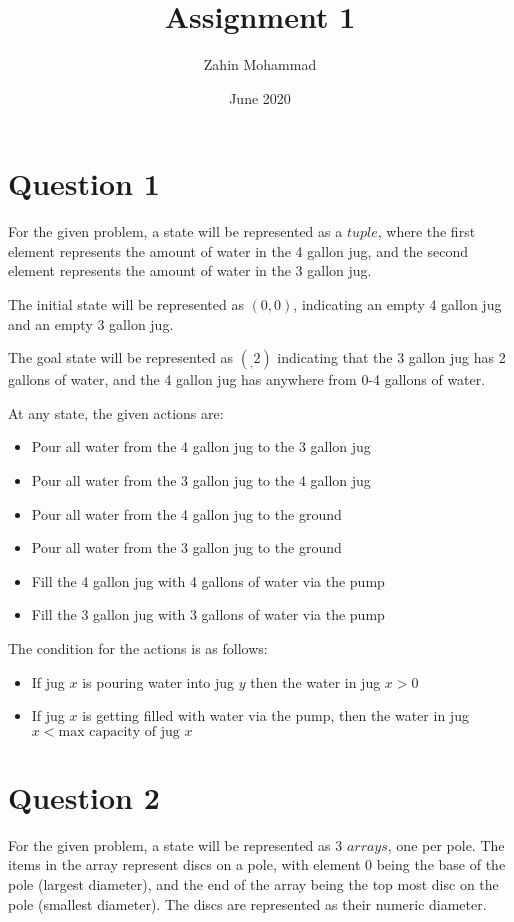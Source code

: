 \documentclass{article}
\title{Assignment 1}
\author{Zahin Mohammad}
\date{June 2020}
\begin{document}
\maketitle
\section{Question 1}
For the given problem, a state will be represented as a $tuple$, where the first element represents the amount of water in the 4 gallon jug, and the second element represents the amount of water in the 3 gallon jug. 
\setlength{\parskip}{6pt}

The initial state will be represented as $(0,0)$, indicating an empty 4 gallon jug and an empty 3 gallon jug. 
\setlength{\parskip}{6pt}

The goal state will be represented as $(_,2)$ indicating that the 3 gallon jug has 2 gallons of water, and the 4 gallon jug has anywhere from 0-4 gallons of water.

At any state, the given actions are:
\begin{itemize}
    \item Pour all water from the 4 gallon jug to the 3 gallon jug 
    \item Pour all water from the 3 gallon jug to the 4 gallon jug
    \item Pour all water from the 4 gallon jug to the ground
    \item Pour all water from the 3 gallon jug to the ground
    \item Fill the 4 gallon jug with 4 gallons of water via the pump
    \item Fill the 3 gallon jug with 3 gallons of water via the pump
\end{itemize}

The condition for the actions is as follows:
\begin{itemize}
    \item If jug $x$ is pouring water into jug $y$ then the water in jug $x>0$
    \item If jug $x$ is getting filled with water via the pump, then the water in jug $x < \mbox{max capacity of jug } x$
\end{itemize}

\section{Question 2}
For the given problem, a state will be represented as 3 $arrays$, one per pole. The items in the array represent discs on a pole, with element $0$ being the base of the pole (largest diameter), and the end of the array being the top most disc on the pole (smallest diameter). The discs are represented as their numeric diameter.
\setlength{\parskip}{6pt}
\end{document}
